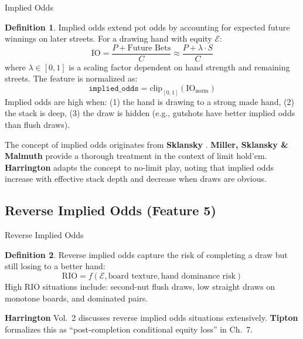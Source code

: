 \documentclass[11pt, a4paper]{article}
\theoremstyle{definition}
\newtheorem{definition}{Definition}[section]
\newcommand{\feature}[1]{\texttt{#1}}
\newcommand{\clip}[1]{\text{clip}_{[0,1]}\!\left(#1\right)}
\begin{document}
\begin{featurebox}{Implied Odds}
\begin{definition}
Implied odds extend pot odds by accounting for expected future winnings on later streets. For a drawing hand with equity $\mathcal{E}$:
\begin{equation}
    \text{IO} = \frac{P + \text{Future Bets}}{C} \approx \frac{P + \lambda \cdot S}{C}
\end{equation}
where $\lambda \in [0, 1]$ is a scaling factor dependent on hand strength and remaining streets. The feature is normalized as:
\begin{equation}
    \feature{implied\_odds} = \clip{\text{IO}_{\text{norm}}}
\end{equation}
Implied odds are high when: (1) the hand is drawing to a strong made hand, (2) the stack is deep, (3) the draw is hidden (e.g., gutshots have better implied odds than flush draws).
\end{definition}
\end{featurebox}

\begin{refbox}
The concept of implied odds originates from \textbf{Sklansky} \cite{sklansky1999}. \textbf{Miller, Sklansky \& Malmuth} \cite{miller2004} provide a thorough treatment in the context of limit hold'em. \textbf{Harrington} \cite{harrington2004} adapts the concept to no-limit play, noting that implied odds increase with effective stack depth and decrease when draws are obvious.
\end{refbox}

\subsection{Reverse Implied Odds (Feature 5)}

\begin{featurebox}{Reverse Implied Odds}
\begin{definition}
Reverse implied odds capture the risk of completing a draw but still losing to a better hand:
\begin{equation}
    \text{RIO} = f(\mathcal{E}, \text{board texture}, \text{hand dominance risk})
\end{equation}
High RIO situations include: second-nut flush draws, low straight draws on monotone boards, and dominated pairs.
\end{definition}
\end{featurebox}

\begin{refbox}
\textbf{Harrington} \cite{harrington2004} Vol.~2 discusses reverse implied odds situations extensively. \textbf{Tipton} \cite{tipton2019} formalizes this as ``post-completion conditional equity loss'' in Ch.~7.
\end{refbox}
\end{document}
